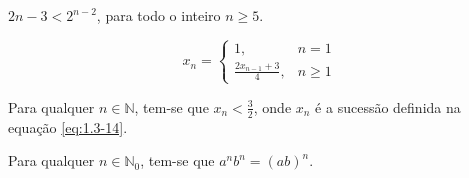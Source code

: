 \clearpage
{}

\begin{proposition}
	$2n - 3 < 2^{n - 2}$, para todo o inteiro $n\geq 5$.
\end{proposition}


\begin{equation}\label{eq:1.3-14}
	x_n =
	\begin{cases}
		1, &n = 1\\
		\frac{2x_{n - 1} + 3}{4}, &n \geq 1
	\end{cases}
\end{equation}

\begin{proposition}
	Para qualquer $n \in \mathbb{N}$, tem-se que $x_n < \frac{3}{2}$, onde
	$x_n$ é a sucessão definida na equação \ref{eq:1.3-14}.
\end{proposition}


\begin{proposition}
	Para qualquer $n \in \mathbb{N}_0$, tem-se que $a^nb^n = (ab)^n$.
\end{proposition}
